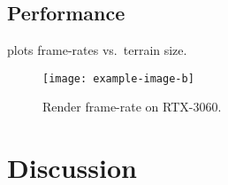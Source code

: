 \documentclass{report}
\begin{document}
\section{Performance}
 plots frame-rates vs.\ terrain size.

\begin{figure}[ht]
  \centering
  \texttt{[image: example-image-b]}
  \caption{Render frame-rate on RTX-3060.}
  \label{fig:fps}
\end{figure}

\chapter{Discussion}
\blindtext[2]
\end{document}
